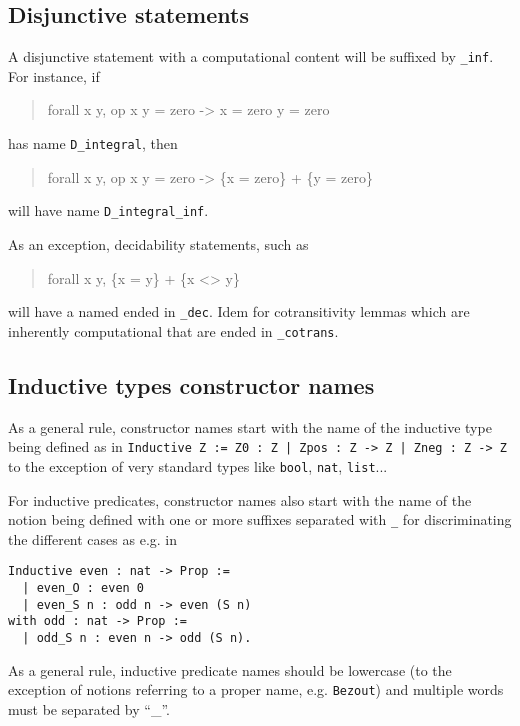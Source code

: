 \documentclass[a4paper]{article}
\newcommand\name[1]{\texttt{#1}}
\begin{document}
\subsection{Disjunctive statements}

A disjunctive statement with a computational content will be suffixed
by \name{\_inf}. For instance, if

\begin{quote}
\begin{tt}
{forall x y, op x y = zero -> x = zero \/ y = zero}
\end{tt}
\end{quote}
has name \texttt{D\_integral}, then
\begin{quote}
\begin{tt}
{forall x y, op x y = zero -> \{x = zero\} + \{y = zero\}}
\end{tt}
\end{quote}
will have name \texttt{D\_integral\_inf}.

As an exception, decidability statements, such as 
\begin{quote}
\begin{tt}
{forall x y, \{x = y\} + \{x <> y\}}
\end{tt}
\end{quote}
will have a named ended in \texttt{\_dec}. Idem for cotransitivity
lemmas which are inherently computational that are ended in
\texttt{\_cotrans}.

\subsection{Inductive types constructor names}

As a general rule, constructor names start with the name of the
inductive type being defined as in \texttt{Inductive Z := Z0 : Z |
  Zpos : Z -> Z | Zneg : Z -> Z} to the exception of very standard
types like \texttt{bool}, \texttt{nat}, \texttt{list}...

For inductive predicates, constructor names also start with the name
of the notion being defined with one or more suffixes separated with
\texttt{\_} for discriminating the different cases as e.g. in

\begin{verbatim}
Inductive even : nat -> Prop :=
  | even_O : even 0
  | even_S n : odd n -> even (S n)
with odd : nat -> Prop :=
  | odd_S n : even n -> odd (S n).
\end{verbatim}

As a general rule, inductive predicate names should be lowercase (to
the exception of notions referring to a proper name, e.g. \texttt{Bezout})
and multiple words must be separated by ``{\_}''.
\end{document}
